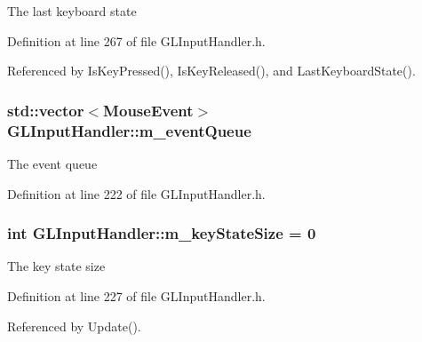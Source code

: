The last keyboard state 



Definition at line 267 of file G\+L\+Input\+Handler.\+h.



Referenced by Is\+Key\+Pressed(), Is\+Key\+Released(), and Last\+Keyboard\+State().

\subsubsection[{\texorpdfstring{m\+\_\+event\+Queue}{m_eventQueue}}]{\setlength{\rightskip}{0pt plus 5cm}std\+::vector$<${\bf Mouse\+Event}$>$ G\+L\+Input\+Handler\+::m\+\_\+event\+Queue\hspace{0.3cm}{\ttfamily [private]}}\hypertarget{class_g_l_input_handler_ada1ba238aee9b9d4e40cbd8e6dcde471}{}\label{class_g_l_input_handler_ada1ba238aee9b9d4e40cbd8e6dcde471}


The event queue 



Definition at line 222 of file G\+L\+Input\+Handler.\+h.

\subsubsection[{\texorpdfstring{m\+\_\+key\+State\+Size}{m_keyStateSize}}]{\setlength{\rightskip}{0pt plus 5cm}int G\+L\+Input\+Handler\+::m\+\_\+key\+State\+Size = 0\hspace{0.3cm}{\ttfamily [private]}}\hypertarget{class_g_l_input_handler_afeb05710f1ab21056dd404ba6f41b4b3}{}\label{class_g_l_input_handler_afeb05710f1ab21056dd404ba6f41b4b3}


The key state size 



Definition at line 227 of file G\+L\+Input\+Handler.\+h.



Referenced by Update().

